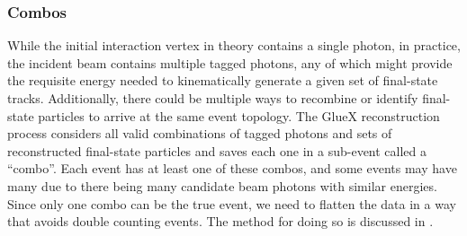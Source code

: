 \subsubsection{Combos}\label{subsub:combos}

While the initial interaction vertex in theory contains a single photon, in practice, the incident beam contains multiple tagged photons, any of which might provide the requisite energy needed to kinematically generate a given set of final-state tracks. Additionally, there could be multiple ways to recombine or identify final-state particles to arrive at the same event topology. The GlueX reconstruction process considers all valid combinations of tagged photons and sets of reconstructed final-state particles and saves each one in a sub-event called a ``combo''. Each event has at least one of these combos, and some events may have many due to there being many candidate beam photons with similar energies. Since only one combo can be the true event, we need to flatten the data in a way that avoids double counting events. The method for doing so is discussed in .
